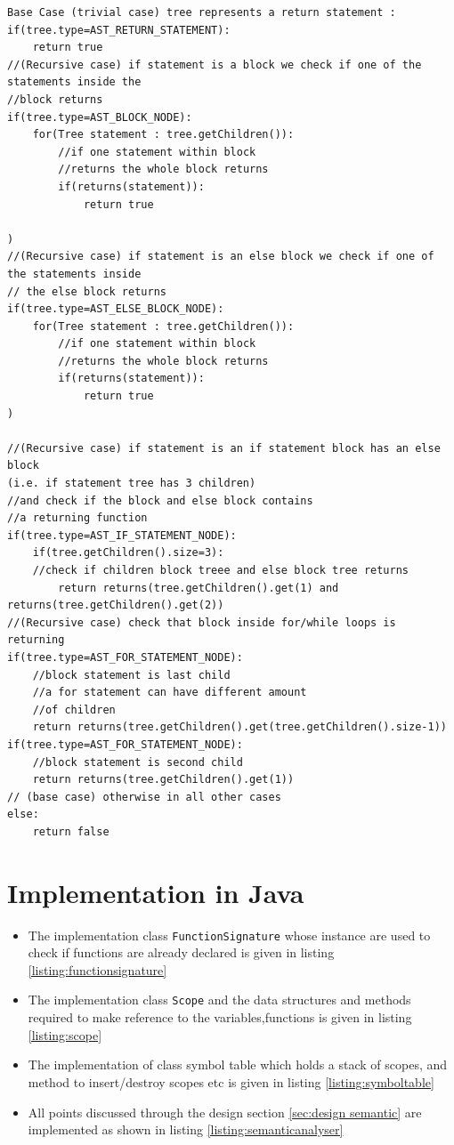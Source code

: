 \begin{lstlisting}[caption=PSEUDOCODE: \textbf{Defining predicate \emph{returns(Tree tree)}}]
Base Case (trivial case) tree represents a return statement :
if(tree.type=AST_RETURN_STATEMENT):
    return true
//(Recursive case) if statement is a block we check if one of the statements inside the
//block returns
if(tree.type=AST_BLOCK_NODE):
    for(Tree statement : tree.getChildren()):
        //if one statement within block
        //returns the whole block returns
        if(returns(statement)):
            return true
        
)
//(Recursive case) if statement is an else block we check if one of the statements inside
// the else block returns
if(tree.type=AST_ELSE_BLOCK_NODE):
    for(Tree statement : tree.getChildren()):
        //if one statement within block
        //returns the whole block returns
        if(returns(statement)):
            return true
)

//(Recursive case) if statement is an if statement block has an else block
(i.e. if statement tree has 3 children)
//and check if the block and else block contains
//a returning function
if(tree.type=AST_IF_STATEMENT_NODE):
    if(tree.getChildren().size=3):
    //check if children block treee and else block tree returns
        return returns(tree.getChildren().get(1) and returns(tree.getChildren().get(2))
//(Recursive case) check that block inside for/while loops is returning 
if(tree.type=AST_FOR_STATEMENT_NODE):
    //block statement is last child 
    //a for statement can have different amount 
    //of children
    return returns(tree.getChildren().get(tree.getChildren().size-1))
if(tree.type=AST_FOR_STATEMENT_NODE):
    //block statement is second child
    return returns(tree.getChildren().get(1))
// (base case) otherwise in all other cases 
else:
    return false
\end{lstlisting}




\section{Implementation in Java}
\begin{itemize}
	\item The implementation class \verb!FunctionSignature! whose instance are used to check if functions are already declared is given in listing \ref{listing:functionsignature}
	\item The implementation class \verb!Scope! and the data structures and methods required to make reference to the variables,functions is given in listing \ref{listing:scope}
	\item The implementation of class symbol table which holds a stack of scopes, and method to insert/destroy scopes etc is given in listing \ref{listing:symboltable}
	\item All points discussed through the design section \ref{sec:design semantic} are implemented as shown in listing \ref{listing:semanticanalyser}
\end{itemize}
    
